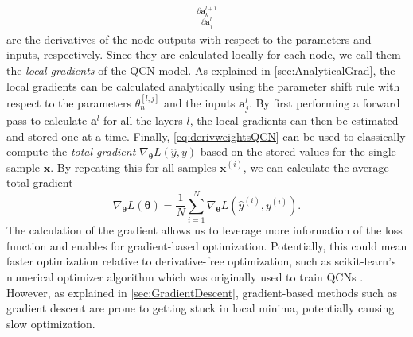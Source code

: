 \begin{equation}\label{eq:localGradients}
\begin{aligned}
     \frac{\partial \boldsymbol{a}^{l+1}_k}{\partial \boldsymbol{a}^{l}_j}
\end{aligned}
\end{equation} are the derivatives of the node outputs with respect to the parameters and inputs, respectively. Since they are calculated locally for each node, we call them the \emph{local gradients} of the QCN model. As explained in \cref{sec:AnalyticalGrad}, the local gradients can be calculated analytically using the parameter shift rule with respect to the parameters $\theta^{[l,j]}_n$ and the inputs $\boldsymbol{a}^{l}_j$. By first performing a forward pass to calculate $\boldsymbol{a}^{l}$ for all the layers $l$, the local gradients can then be estimated and stored one at a time. Finally, \cref{eq:derivweightsQCN} can be used to classically compute the \emph{total gradient} $\nabla_{\boldsymbol{\theta}} L(\hat{y},y)$ based on the stored values for the single sample $\boldsymbol{x}$. By repeating this for all samples $\boldsymbol{x}^{(i)}$, we can calculate the average total gradient \begin{equation}\label{eq:averageGradientQCN}
    \nabla_{\boldsymbol{\theta}} L(\boldsymbol{\theta}) = \frac{1}{N}\sum_{i=1}^N \nabla_{\boldsymbol{\theta}} L(\hat{y}^{(i)}, y^{(i)}).
\end{equation}  The calculation of the gradient allows us to leverage more information of the loss function and enables for gradient-based optimization. Potentially, this could mean faster optimization relative to derivative-free optimization, such as scikit-learn's numerical optimizer algorithm \cite{scikit-learn} which was originally used to train QCNs \cite{stian}. However, as explained in \cref{sec:GradientDescent}, gradient-based methods such as gradient descent are prone to getting stuck in local minima, potentially causing slow optimization.    


